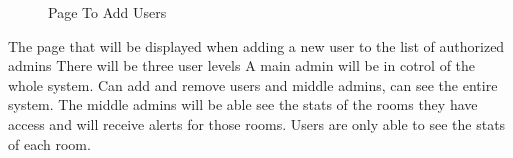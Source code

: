\documentclass{report}
\begin{document}
\begin{figure}[H]
\caption{Page To Add Users}
\end{figure}
The page that will be displayed when adding a new user to the list of authorized admins
\newline
There will be three user levels
A main admin will be in cotrol of the whole system. Can add and remove users and middle admins, can see the entire system.
\newline
The middle admins will be able see the stats of the rooms they have access and will receive alerts for those rooms.
\newline
Users are only able to see the stats of each room. 

\newpage
\end{document}
